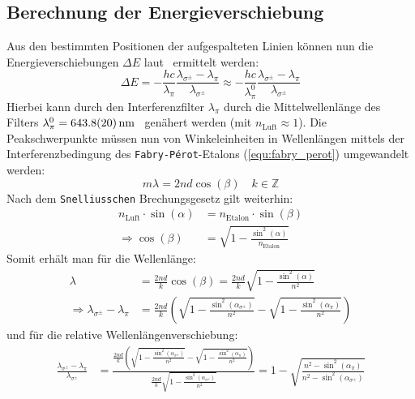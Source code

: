 \subsection{Berechnung der Energieverschiebung}
Aus den bestimmten Positionen der aufgespalteten Linien können nun die Energieverschiebungen $\Delta E$ laut~\cite{praktikum4} ermittelt werden:
\begin{equation}
    \Delta E = -\frac{hc}{\lambda_{\pi}}\frac{\lambda_{\sigma^{\pm}} - \lambda_{\pi}}{\lambda_{\sigma^{\pm}}}
            \approx -\frac{hc}{\lambda_{\pi}^0}\frac{\lambda_{\sigma^{\pm}} - \lambda_{\pi}}{\lambda_{\sigma^{\pm}}}\label{equ:deltaE_anleitung}
\end{equation}
Hierbei kann durch den Interferenzfilter $\lambda_{\pi}$ durch die Mittelwellenlänge des Filters $\lambda_{\pi}^0 = \SI{643.8 \pm 2}{\nano\meter}$~\cite{praktikum4} genähert werden (mit $n_{\text{Luft}}\approx 1$).
Die Peakschwerpunkte müssen nun von Winkeleinheiten in Wellenlängen mittels der Interferenzbedingung des \texttt{Fabry-Pérot}-Etalons (\cref{equ:fabry_perot}) umgewandelt werden:
\begin{equation*}
    m\lambda = 2nd\cos(\beta)\quad k\in\mathbb{Z}
\end{equation*}
\newpage
\noindent Nach dem \texttt{Snelliusschen} Brechungsgesetz gilt weiterhin:
\begin{align*}
    n_{\text{Luft}}\cdot\sin(\alpha) &= n_{\text{Etalon}}\cdot\sin(\beta)\\
    \Rightarrow \cos(\beta) &= \sqrt{1-\frac{\sin^2(\alpha)}{n_{\text{Etalon}}}}
\end{align*}
Somit erhält man für die Wellenlänge:
\begin{align}
    \lambda &= \frac{2nd}{k}\cos(\beta) = \frac{2nd}{k}\sqrt{1-\frac{\sin^2(\alpha)}{n^2}}\label{equ:lambda}\\
    \Rightarrow \lambda_{\sigma^{\pm}} - \lambda_{\pi} 
        &= \frac{2nd}{k}\left(\sqrt{1-\frac{\sin^2(\alpha_{\sigma^{\pm}})}{n^2}}
                                - \sqrt{1-\frac{\sin^2(\alpha_{\pi})}{n^2}}\right) \nonumber
\end{align}
und für die relative Wellenlängenverschiebung:
\begin{align}
    \frac{\lambda_{\sigma^{\pm}} - \lambda_{\pi}}{\lambda_{\sigma^{\pm}}} 
            &=\frac{\frac{2nd}{k}\left(\sqrt{1-\frac{\sin^2(\alpha_{\sigma^{\pm}})}{n^2}}
            - \sqrt{1-\frac{\sin^2(\alpha_{\pi})}{n^2}}\right)}{\frac{2nd}{k}\sqrt{1-\frac{\sin^2(\alpha_{\sigma^{\pm}})}{n^2}}}= 1-\sqrt{\frac{n^2-\sin^2(\alpha_{\pi})}{n^2-\sin^2(\alpha_{\sigma^{\pm}})}}\label{equ:rel_Wellenanderung}
\end{align}

